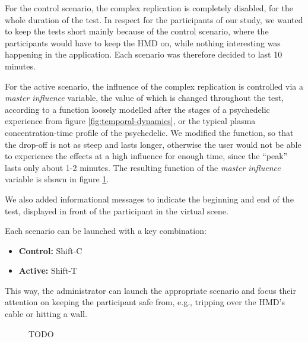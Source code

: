 For the control scenario, the complex replication is completely disabled, for the whole duration of the test. In respect for the participants of our study, we wanted to keep the tests short mainly because of the control scenario, where the participants would have to keep the \ac{HMD} on, while nothing interesting was happening in the application. Each scenario was therefore decided to last 10 minutes.

For the active scenario, the influence of the complex replication is controlled via a \textit{master influence} variable, the value of which is changed throughout the test, according to a function loosely modelled after the stages of a psychedelic experience from figure \ref{fig:temporal-dynamics}, or the typical plasma concentration-time profile of the psychedelic. We modified the function, so that the drop-off is not as steep and lasts longer, otherwise the user would not be able to experience the effects at a high influence for enough time, since the ``peak'' lasts only about 1-2 minutes. The resulting function of the \textit{master influence} variable is shown in figure \ref{fig:master-influence}.

We also added informational messages to indicate the beginning and end of the test, displayed in front of the participant in the virtual scene.

Each scenario can be launched with a key combination:

\begin{itemize}
    \item \textbf{Control:} Shift-C
    \item \textbf{Active:} Shift-T
\end{itemize}

This way, the administrator can launch the appropriate scenario and focus their attention on keeping the participant safe from, e.g., tripping over the \ac{HMD}'s cable or hitting a wall.

\begin{figure}[H]
    \centering
    \ifgraphics
    \fi
    \caption{TODO}\label{fig:master-influence}
\end{figure}
